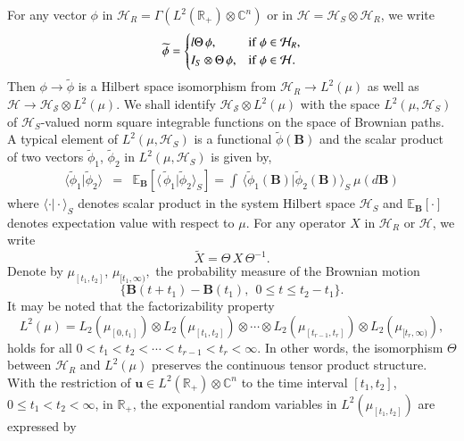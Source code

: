 For any vector $\phi$ in $\mathcal{H}_R=\Gamma(L^2(\mathbb{R}_+)\otimes\mathbb{C}^n)$ or in 
$\mathcal{H}=\mathcal{H}_S\otimes\mathcal{H}_R$, we write 
\begin{eqnarray} 
\widetilde{\phi}=
\begin{cases}
{l} \Theta\, \phi, & {\rm if}\ \phi\in \mathcal{H}_R, \\ 
I_{S}\otimes \Theta\, \phi , & {\rm if}\  \phi\in \mathcal{H}.
\end{cases}  \label{chap8-eq5.2}
\end{eqnarray}
Then $\phi\rightarrow \widetilde{\phi}$ is a Hilbert space isomorphism from $\mathcal{H}_R \rightarrow L^2(\mu)$  as well as  $\mathcal{H}\rightarrow \mathcal{H_S}\otimes L^2(\mu)$.  We shall identify $\mathcal{H_S}\otimes L^2(\mu)$ with the space $L^2(\mu,\mathcal{H}_S)$ of $\mathcal{H}_S$-valued norm square integrable functions on the space of Brownian paths.  A typical element of $L^2(\mu,\mathcal{H}_S)$ is a functional $\widetilde{\phi}(\mathbf{B})$ and the scalar product of two vectors $\widetilde{\phi}_1$, $\widetilde{\phi}_2$ in $L^2(\mu,\mathcal{H}_S)$ is given by, 
\begin{eqnarray} 
\langle \widetilde{\phi}_1\vert \widetilde{\phi}_2\rangle &=& \mathbb{E}_{\mathbf{B}}[\langle\,  \widetilde{\phi}_1\vert \widetilde{\phi}_2\rangle_S]
=\int\, \langle \widetilde{\phi}_1(\mathbf{B})\vert \widetilde{\phi}_2(\mathbf{B})\rangle_S\ 
\mu(d\mathbf{B})\label{chap8-eq5.3}
\end{eqnarray}  
where $\langle \cdot \vert \cdot \rangle_S$ denotes scalar product in the system Hilbert space $\mathcal{H}_S$ and $\mathbb{E}_{\mathbf{B}}[\cdot ]$ denotes  expectation value with respect to  $\mu$.  For any operator $X$ in $\mathcal{H}_R$ or $\mathcal{H}$, we write 
$$
\widetilde{X}=\Theta\, X\, \Theta^{-1}.
$$ 
Denote by $\mu_{[t_1,t_2]}$, $\mu_{[t_1,\infty)},$  the probability measure of the Brownian motion
$$
\{\mathbf{B}(t+t_1)-\mathbf{B}(t_1),\ \ 0\leq t\leq t_2-t_1\}.
$$  
It may be noted that the factorizability property 
\begin{equation} 
L^2(\mu)=L_2(\mu_{[0,t_1]})\otimes L_2(\mu_{[t_1,t_2]})\otimes \cdots \otimes L_2(\mu_{[t_{r-1},t_r]})\otimes L_2(\mu_{[t_r,\infty)}), \label{chap8-eq5.4}
\end{equation} 
holds for all $0< t_1 <t_2 <\cdots <t_{r-1}< t_r < \infty$.  In other words, the  isomorphism $\Theta$ between $\mathcal{H}_R$ and $L^2(\mu)$ preserves the continuous tensor product structure. With the restriction of $\mathbf{u}\in L^2(\mathbb{R}_+)\otimes\mathbb{C}^n$ to the time interval  $[t_1, t_2]$,  $0\leq t_1 <t_2 <\infty$, in $\mathbb{R}_+$, the exponential random variables in $L^2(\mu_{[t_1,t_2]})$ are expressed by   
